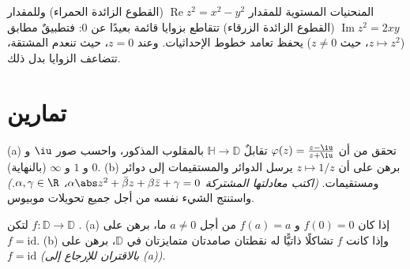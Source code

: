 \begin{omfigure}

{\small المنحنيات المستوية للمقدار $\operatorname{Re}z^2 = x^2 - y^2$ (القطوع الزائدة
الحمراء) وللمقدار $\operatorname{Im}z^2 = 2xy$ (القطوع الزائدة الزرقاء) تتقاطع
بزوايا قائمة بعيدًا عن $0$: فتطبيقٌ مطابق ($z \mapsto z^2$،
حيث $z \neq 0$) يحفظ تعامد خطوط الإحداثيات. وعند $z = 0$، حيث
تنعدم المشتقة، تتضاعف الزوايا بدل ذلك.}
\end{omfigure}

\section{تمارين}

\begin{exercise}[$\star$]\label{exo:b3:conformal:1}
(a) تحقق من أن  $\varphi(z) = \frac{z -
\iu}{z + \iu}$ تقابلٌ $\mathbb H \to \mathbb D$ بالمقلوب
المذكور، واحسب صور $\iu$ و $0$ و $1$ و $\infty$ (بالنهاية).
(b) برهن على أن $z \mapsto 1/z$ يرسل الدوائر والمستقيمات إلى
دوائر ومستقيمات. \emph{(اكتب معادلتها المشتركة $\alpha\abs z^2 + \bar\beta z + \beta\bar z + \gamma = 0$،
$\alpha, \gamma \in \R$.)} واستنتج الشيء نفسه من أجل جميع تحويلات موبيوس.
\end{exercise}

\begin{exercise}[$\star$]\label{exo:b3:conformal:2}
لتكن $f \colon \mathbb D \to \mathbb D$ .
(a) إذا كان $f(0) = 0$ و $f(a) = a$ من أجل $a \neq 0$ ما، برهن
على $f
= \mathrm{id}$.
(b) وإذا كانت $f$ تشاكلًا ذاتيًّا له نقطتان صامدتان متمايزتان
في $\mathbb D$، برهن على $f = \mathrm{id}$ \emph{(بالاقتران 
للإرجاع إلى (a))}.
\end{exercise}

